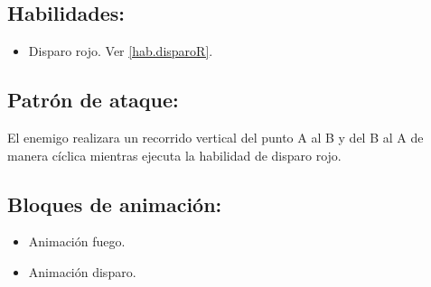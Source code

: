 \subsection{Habilidades:}
\begin{itemize}
	\item Disparo rojo. Ver \ref{hab.disparoR}.
\end{itemize}
\subsection{Patrón de ataque:}
El enemigo realizara un recorrido vertical del punto A al B y del B al A de manera cíclica mientras ejecuta la habilidad de disparo rojo.
\subsection{Bloques de animación:}
		\begin{itemize}
			\item Animación fuego.
			\item Animación disparo.
		\end{itemize}